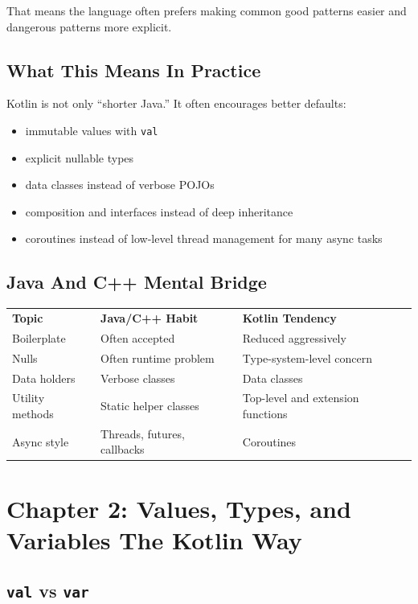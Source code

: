 \documentclass[11pt,a4paper]{article}
\begin{document}
That means the language often prefers making common good patterns easier and dangerous patterns more explicit.

\subsection{What This Means In Practice}

Kotlin is not only ``shorter Java.'' It often encourages better defaults:
\begin{itemize}
    \item immutable values with \texttt{val}
    \item explicit nullable types
    \item data classes instead of verbose POJOs
    \item composition and interfaces instead of deep inheritance
    \item coroutines instead of low-level thread management for many async tasks
\end{itemize}

\subsection{Java And C++ Mental Bridge}

\begin{longtable}{p{} p{} p{}}
\textbf{Topic} & \textbf{Java/C++ Habit} & \textbf{Kotlin Tendency} \\
Boilerplate & Often accepted & Reduced aggressively \\
Nulls & Often runtime problem & Type-system-level concern \\
Data holders & Verbose classes & Data classes \\
Utility methods & Static helper classes & Top-level and extension functions \\
Async style & Threads, futures, callbacks & Coroutines \\
\end{longtable}

\section{Chapter 2: Values, Types, and Variables The Kotlin Way}

\subsection{\texttt{val} vs \texttt{var}}
\end{document}
